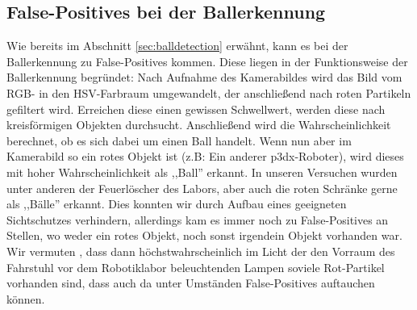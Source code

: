 
\subsection{False-Positives bei der Ballerkennung}
\label{sec:false-positives-bei}
Wie bereits im Abschnitt \ref{sec:balldetection} erwähnt, kann es bei
der Ballerkennung zu False-Positives kommen. Diese liegen in der
Funktionsweise der Ballerkennung begründet: Nach Aufnahme des
Kamerabildes wird das Bild vom RGB- in den HSV-Farbraum umgewandelt,
der anschließend nach roten Partikeln gefiltert wird. Erreichen diese
einen gewissen Schwellwert, werden diese nach kreisförmigen Objekten
durchsucht. Anschließend wird die Wahrscheinlichkeit berechnet, ob es
sich dabei um einen Ball handelt. Wenn nun aber im Kamerabild so ein
rotes Objekt ist (z.B: Ein anderer p3dx-Roboter), wird dieses mit
hoher Wahrscheinlichkeit als ,,Ball'' erkannt. In unseren Versuchen
wurden unter anderen der Feuerlöscher des Labors, aber auch die roten
Schränke gerne als ,,Bälle'' erkannt. Dies konnten wir durch Aufbau
eines geeigneten Sichtschutzes verhindern, allerdings kam es immer
noch zu False-Positives an Stellen, wo weder ein rotes Objekt, noch
sonst irgendein Objekt vorhanden war. Wir vermuten , dass dann höchstwahrscheinlich im
Licht der den Vorraum des Fahrstuhl vor dem Robotiklabor beleuchtenden
Lampen soviele Rot-Partikel vorhanden sind, dass auch da unter
Umständen False-Positives auftauchen können.
